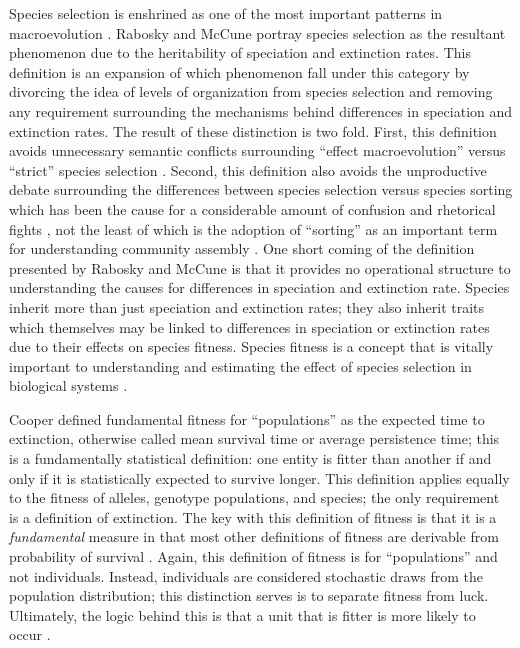 Species selection is enshrined as one of the most important patterns in macroevolution \citep{Stanley1975,Stanley1979,Vrba1986,Jablonski2008a,Rabosky2010b,Simpson2016a,Pennell2014}. Rabosky and McCune \citep{Rabosky2010b} portray species selection as the resultant phenomenon due to the heritability of speciation and extinction rates. This definition is an expansion of which phenomenon fall under this category by divorcing the idea of levels of organization from species selection and removing any requirement surrounding the mechanisms behind differences in speciation and extinction rates. The result of these distinction is two fold. First, this definition avoids unnecessary semantic conflicts surrounding ``effect macroevolution'' versus ``strict'' species selection \citep{Jablonski2007,Jablonski2008a,Vrba1984}. Second, this definition also avoids the unproductive debate surrounding the differences between species selection versus species sorting which has been the cause for a considerable amount of confusion and rhetorical fights \citep{Vrba1984a,Vrba1986,Lloyd1993,Pennell2014}, not the least of which is the adoption of ``sorting'' as an important term for understanding community assembly \citep{Urban2008,Loeuille2008,Holt2006,Cottenie2005,Soininen2014,VanderGucht2007,Shipley2006}. One short coming of the definition presented by Rabosky and McCune \citep{Rabosky2010b} is that it provides no operational structure to understanding the causes for differences in speciation and extinction rate. Species inherit more than just speciation and extinction rates; they also inherit traits which themselves may be linked to differences in speciation or extinction rates due to their effects on species fitness. Species fitness is a concept that is vitally important to understanding and estimating the effect of species selection in biological systems \citep{Cooper1984,Palmer2012}. 

Cooper \citep{Cooper1984} defined fundamental fitness for ``populations'' as the expected time to extinction, otherwise called mean survival time or average persistence time; this is a fundamentally statistical definition: one entity is fitter than another if and only if it is statistically expected to survive longer. This definition applies equally to the fitness of alleles, genotype populations, and species; the only requirement is a  definition of extinction. The key with this definition of fitness is that it is a \textit{fundamental} measure in that most other definitions of fitness are derivable from probability of survival \citep{Cooper1984}. Again, this definition of fitness is for ``populations'' and not individuals. Instead, individuals are considered stochastic draws from the population distribution; this distinction serves is to separate fitness from luck. Ultimately, the logic behind this is that a unit that is fitter is more likely to occur \citep{Cooper1984}.

